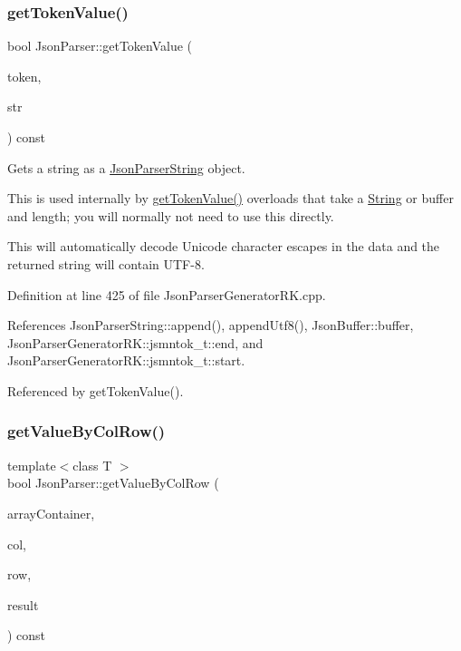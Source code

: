 \subsubsection{\texorpdfstring{get\+Token\+Value()}{getTokenValue()}\hspace{0.1cm}{\footnotesize\ttfamily [8/8]}}
{\footnotesize\ttfamily bool Json\+Parser\+::get\+Token\+Value (\begin{DoxyParamCaption}\item[{const \hyperlink{struct_json_parser_generator_r_k_1_1jsmntok__t}{Json\+Parser\+Generator\+R\+K\+::jsmntok\+\_\+t} $\ast$}]{token,  }\item[{\hyperlink{class_json_parser_string}{Json\+Parser\+String} \&}]{str }\end{DoxyParamCaption}) const}



Gets a string as a \hyperlink{class_json_parser_string}{Json\+Parser\+String} object. 

This is used internally by \hyperlink{class_json_parser_a5f9e5c2453307a99a54fcf26fbd68dd4}{get\+Token\+Value()} overloads that take a \hyperlink{class_string}{String} or buffer and length; you will normally not need to use this directly.

This will automatically decode Unicode character escapes in the data and the returned string will contain U\+T\+F-\/8. 

Definition at line 425 of file Json\+Parser\+Generator\+R\+K.\+cpp.



References Json\+Parser\+String\+::append(), append\+Utf8(), Json\+Buffer\+::buffer, Json\+Parser\+Generator\+R\+K\+::jsmntok\+\_\+t\+::end, and Json\+Parser\+Generator\+R\+K\+::jsmntok\+\_\+t\+::start.



Referenced by get\+Token\+Value().

\mbox{\label{class_json_parser_af1f4a3a65b5cc9cd19b129c410aa78e0}} 
\subsubsection{\texorpdfstring{get\+Value\+By\+Col\+Row()}{getValueByColRow()}}
{\footnotesize\ttfamily template$<$class T $>$ \\
bool Json\+Parser\+::get\+Value\+By\+Col\+Row (\begin{DoxyParamCaption}\item[{const \hyperlink{struct_json_parser_generator_r_k_1_1jsmntok__t}{Json\+Parser\+Generator\+R\+K\+::jsmntok\+\_\+t} $\ast$}]{array\+Container,  }\item[{size\+\_\+t}]{col,  }\item[{size\+\_\+t}]{row,  }\item[{T \&}]{result }\end{DoxyParamCaption}) const\hspace{0.3cm}{\ttfamily [inline]}}



